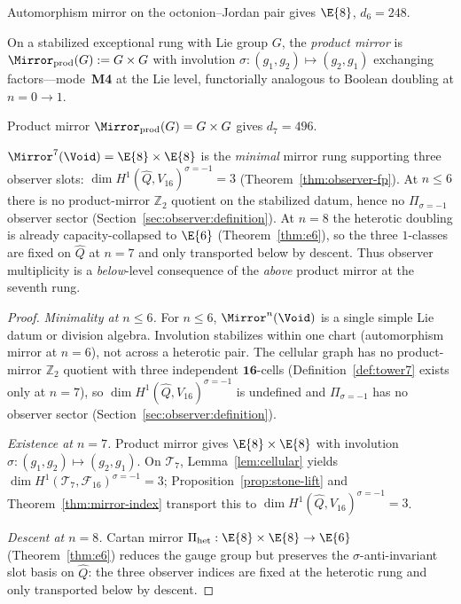\begin{theorem}[$\Mirror^6(\Void)=\E{8}$]\label{thm:e8}
Automorphism mirror on the octonion--Jordan pair gives $\E{8}$, $d_6=248$.
\end{theorem}

\begin{definition}\label{def:prod-mirror}
On a stabilized exceptional rung with Lie group $G$, the \emph{product mirror}
is $\Mirror_{\mathrm{prod}}(G):=G\times G$ with involution
$\sigma:(g_1,g_2)\mapsto(g_2,g_1)$ exchanging factors---mode~\textbf{M4} at the
Lie level, functorially analogous to Boolean doubling at $n=0\to1$.
\end{definition}

\begin{theorem}[$\Mirror^7(\Void)=\E{8}\times\E{8}$]\label{thm:e8e8}
Product mirror $\Mirror_{\mathrm{prod}}(G)=G\times G$ gives $d_7=496$.
\end{theorem}

\begin{proposition}\label{prop:climb:minimal-heterotic}
$\Mirror^7(\Void)=\E{8}\times\E{8}$ is the \emph{minimal} mirror rung supporting
three observer slots: $\dim H^1(\hat Q,V_{16})^{\sigma=-1}=3$
(Theorem~\ref{thm:observer-fp}). At $n\leq6$ there is no product-mirror
$\mathbb{Z}_2$ quotient on the stabilized datum, hence no
$\Pi_{\sigma=-1}$ observer sector (Section~\ref{sec:observer:definition}). At
$n=8$ the heterotic doubling is already capacity-collapsed to $\E{6}$
(Theorem~\ref{thm:e6}), so the three $1$-classes are fixed on $\hat Q$ at
$n=7$ and only transported below by descent. Thus observer multiplicity is a
\emph{below}-level consequence of the \emph{above} product mirror at the
seventh rung.
\end{proposition}

\begin{proof}
\emph{Minimality at $n\leq6$.}
For $n\leq6$, $\Mirror^n(\Void)$ is a single simple Lie datum or division
algebra. Involution stabilizes within one chart (automorphism mirror at $n=6$),
not across a heterotic pair. The cellular graph has no product-mirror
$\mathbb{Z}_2$ quotient with three independent $\mathbf{16}$-cells
(Definition~\ref{def:tower7} exists only at $n=7$), so
$\dim H^1(\hat Q,V_{16})^{\sigma=-1}$ is undefined and
$\Pi_{\sigma=-1}$ has no observer sector
(Section~\ref{sec:observer:definition}).

\emph{Existence at $n=7$.}
Product mirror gives $\E{8}\times\E{8}$ with involution
$\sigma:(g_1,g_2)\mapsto(g_2,g_1)$. On $\mathcal{T}_7$,
Lemma~\ref{lem:cellular} yields
$\dim H^1(\mathcal{T}_7,\mathcal{F}_{16})^{\sigma=-1}=3$; Proposition~\ref{prop:stone-lift}
and Theorem~\ref{thm:mirror-index} transport this to
$\dim H^1(\hat Q,V_{16})^{\sigma=-1}=3$.

\emph{Descent at $n=8$.}
Cartan mirror $\Pi_{\mathrm{het}}:\E{8}\times\E{8}\to\E{6}$
(Theorem~\ref{thm:e6}) reduces the gauge group but preserves the
$\sigma$-anti-invariant slot basis on $\hat Q$: the three observer indices are
fixed at the heterotic rung and only transported below by descent.
\end{proof}

